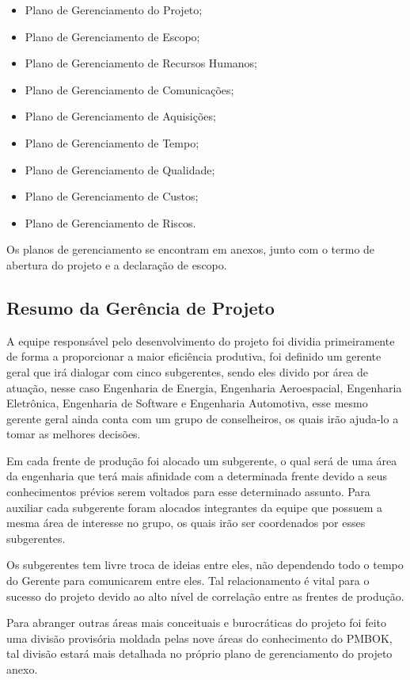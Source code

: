   \begin{itemize}
  \item Plano de Gerenciamento do Projeto;
  \item Plano de Gerenciamento de Escopo;
  \item Plano de Gerenciamento de Recursos Humanos;
  \item Plano de Gerenciamento de Comunicações;
  \item Plano de Gerenciamento de Aquisições;
  \item Plano de Gerenciamento de Tempo;
  \item Plano de Gerenciamento de Qualidade;
  \item Plano de Gerenciamento de Custos;
  \item Plano de Gerenciamento de Riscos.
  \end{itemize}
  
  Os planos de gerenciamento se encontram em anexos, junto com o termo de abertura do projeto e a declaração de escopo.
  
  \subsection{Resumo da Gerência de Projeto}
    A equipe responsável pelo desenvolvimento do projeto foi dividia primeiramente de forma a proporcionar a maior
    eficiência produtiva, foi definido um gerente geral que irá dialogar com cinco subgerentes, sendo eles divido por
    área de atuação, nesse caso Engenharia de Energia, Engenharia Aeroespacial, Engenharia Eletrônica, Engenharia de Software
    e Engenharia Automotiva, esse mesmo gerente geral ainda conta com um grupo de conselheiros, os quais irão ajuda-lo
    a tomar as melhores decisões.

    Em cada frente de produção foi alocado um subgerente, o qual será de uma área da engenharia que terá mais afinidade
    com a determinada frente devido a seus conhecimentos prévios serem voltados para esse determinado assunto.
    Para auxiliar cada subgerente foram alocados integrantes da equipe que possuem a mesma área de interesse no grupo,
    os quais irão ser coordenados por esses subgerentes.

    Os subgerentes tem livre troca de ideias entre eles, não dependendo todo o tempo do Gerente para comunicarem entre eles. 
    Tal relacionamento é vital para o sucesso do projeto devido ao alto nível de correlação entre as frentes de produção.

    Para abranger outras áreas mais conceituais e burocráticas do projeto foi feito uma divisão provisória moldada pelas
    nove áreas do conhecimento do PMBOK, tal divisão estará mais detalhada no próprio plano de gerenciamento do projeto anexo.
    
